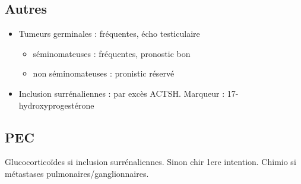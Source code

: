 \documentclass[11pt]{article}
\begin{document}
\subsection{Autres}
\label{sec:org99bbd58}
\begin{itemize}
\item Tumeurs germinales : fréquentes, écho testiculaire
\begin{itemize}
\item séminomateuses : fréquentes, pronostic bon
\item non séminomateuses : pronistic réservé
\end{itemize}
\item Inclusion surrénaliennes : par excès ACTSH. Marqueur : 17-hydroxyprogestérone
\end{itemize}

\subsection{PEC}
\label{sec:org2448def}
Glucocorticoïdes si inclusion surrénaliennes. Sinon chir 1ere intention. Chimio si métastases pulmonaires/ganglionnaires.
\end{document}
